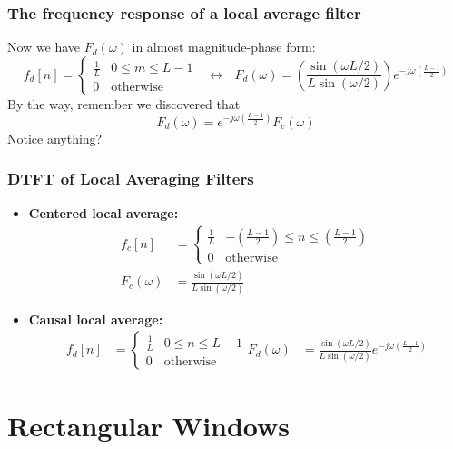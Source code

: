 \documentclass{beamer}
\begin{document}
\begin{frame}
  \frametitle{The frequency response of a local average filter}

  Now we have $F_d(\omega)$ in almost magnitude-phase form:
  \[
  f_d[n] = \begin{cases} \frac{1}{L}& 0\le m\le L-1\\
    0&\mbox{otherwise}\end{cases}~~~\leftrightarrow~~~
  F_d(\omega)=\left(\frac{\sin(\omega L/2)}{L\sin(\omega/2)}\right)e^{-j\omega\left(\frac{L-1}{2}\right)}
  \]
  By the way, remember we discovered that
  \[
  F_d(\omega)=e^{-j\omega\left(\frac{L-1}{2}\right)}F_c(\omega)
  \]
  Notice anything?
\end{frame}

\begin{frame}
  \frametitle{DTFT of Local Averaging Filters}

  \begin{itemize}
  \item {\bf Centered local average:}
    \begin{align*}
      f_c[n] &= \begin{cases} \frac{1}{L}& -\left(\frac{L-1}{2}\right)\le n\le\left(\frac{L-1}{2}\right)\\
        0&\mbox{otherwise}\end{cases}\\
      F_c(\omega)&=\frac{\sin(\omega L/2)}{L\sin(\omega/2)}
    \end{align*}
  \item {\bf Causal local average:}
    \begin{align*}
      f_d[n] &= \begin{cases} \frac{1}{L}& 0\le n\le L-1\\
        0&\mbox{otherwise}\end{cases}
      F_d(\omega) &=\frac{\sin(\omega L/2)}{L\sin(\omega/2)}e^{-j\omega\left(\frac{L-1}{2}\right)}
    \end{align*}
  \end{itemize}
\end{frame}

\section[Rectangles]{Rectangular Windows}
\setcounter{subsection}{1}
\end{document}
